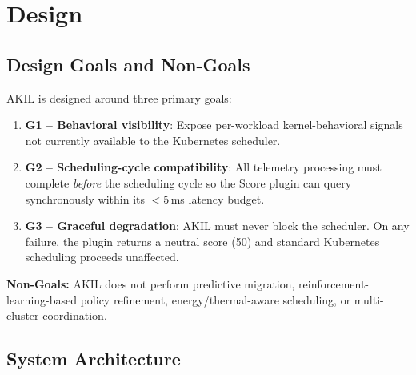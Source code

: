 \documentclass[10pt,conference,a4paper]{IEEEtran}
\begin{document}
\section{Design}
\label{sec:design}

\subsection{Design Goals and Non-Goals}

AKIL is designed around three primary goals:

\begin{enumerate}[leftmargin=*,topsep=2pt,itemsep=1pt]
  \item \textbf{G1 -- Behavioral visibility}: Expose per-workload kernel-behavioral
        signals not currently available to the Kubernetes scheduler.
  \item \textbf{G2 -- Scheduling-cycle compatibility}: All telemetry processing must
        complete \emph{before} the scheduling cycle so the Score plugin can query
        synchronously within its $<5$\,ms latency budget.
  \item \textbf{G3 -- Graceful degradation}: AKIL must never block the scheduler.
        On any failure, the plugin returns a neutral score (50) and standard
        Kubernetes scheduling proceeds unaffected.
\end{enumerate}

\noindent\textbf{Non-Goals:} AKIL does not perform predictive migration,
reinforcement-learning-based policy refinement, energy/thermal-aware scheduling,
or multi-cluster coordination.

\subsection{System Architecture}
\end{document}
